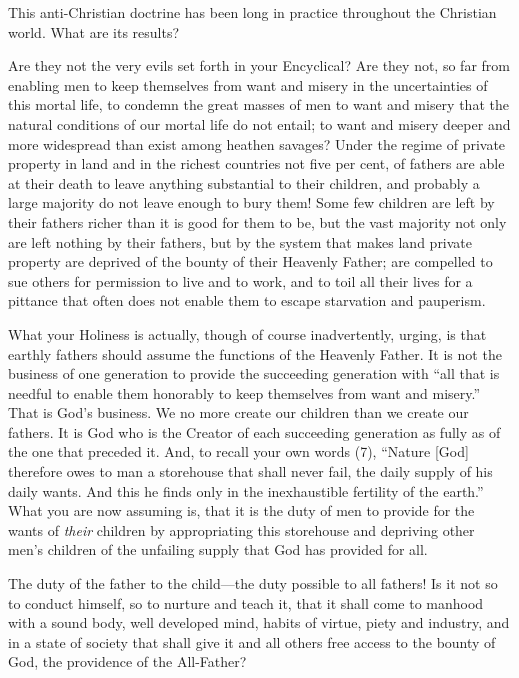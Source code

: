 \documentclass{book}
\begin{document}
This anti-Christian doctrine has been long in practice throughout the Christian world. What are its results?

Are they not the very evils set forth in your Encyclical? Are they not, so far from enabling men to keep themselves from want and misery in the uncertainties of this mortal life, to condemn the great masses of men to want and misery that the natural conditions of our mortal life do not entail; to want and misery deeper and more widespread than exist among heathen savages? Under the regime of private property in land and in the richest countries not five per cent, of fathers are able at their death to leave anything substantial to their children, and probably a large majority do not leave enough to bury them! Some few children are left by their fathers richer than it is good for them to be, but the vast majority not only are left nothing by their fathers, but by the system that makes land private property are deprived of the bounty of their Heavenly Father; are compelled to sue others for permission to live and to work, and to toil all their lives for a pittance that often does not enable them to escape starvation and pauperism.

What your Holiness is actually, though of course inadvertently, urging, is that earthly fathers should assume the functions of the Heavenly Father. It is not the business of one generation to provide the succeeding generation with “all that is needful to enable them honorably to keep themselves from want and misery.” That is God’s business. We no more create our children than we create our fathers. It is God who is the Creator of each succeeding generation as fully as of the one that preceded it. And, to recall your own words (7), “Nature {[}God{]} therefore owes to man a storehouse that shall never fail, the daily supply of his daily wants. And this he finds only in the inexhaustible fertility of the earth.” What you are now assuming is, that it is the duty of men to provide for the wants of \emph{their} children by appropriating this storehouse and depriving other men’s children of the unfailing supply that God has provided for all.

The duty of the father to the child—the duty possible to all fathers! Is it not so to conduct himself, so to nurture and teach it, that it shall come to manhood with a sound body, well developed mind, habits of virtue, piety and industry, and in a state of society that shall give it and all others free access to the bounty of God, the providence of the All-Father?
\end{document}
